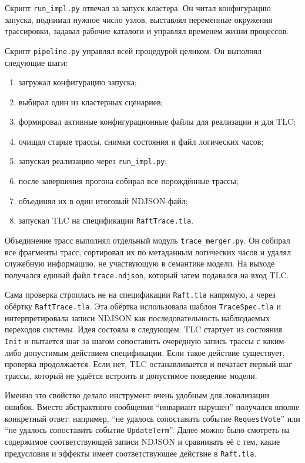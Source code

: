 Скрипт \texttt{run\_impl.py} отвечал за запуск кластера. Он читал конфигурацию
запуска, поднимал нужное число узлов, выставлял переменные окружения
трассировки, задавал рабочие каталоги и управлял временем жизни процессов.

Скрипт \texttt{pipeline.py} управлял всей процедурой целиком. Он выполнял
следующие шаги:

\begin{enumerate}
    \item загружал конфигурацию запуска;
    \item выбирал один из кластерных сценариев;
    \item формировал активные конфигурационные файлы для реализации и для TLC;
    \item очищал старые трассы, снимки состояния и файл логических часов;
    \item запускал реализацию через \texttt{run\_impl.py};
    \item после завершения прогона собирал все порождённые трассы;
    \item объединял их в один итоговый NDJSON-файл;
    \item запускал TLC на спецификации \texttt{RaftTrace.tla}.
\end{enumerate}

Объединение трасс выполнял отдельный модуль \texttt{trace\_merger.py}. Он
собирал все фрагменты трасс, сортировал их по метаданным логических часов и
удалял служебную информацию, не участвующую в семантике модели. На выходе
получался единый файл \texttt{trace.ndjson}, который затем подавался на вход
TLC.

Сама проверка строилась не на спецификации \texttt{Raft.tla} напрямую, а через
обёртку \texttt{RaftTrace.tla}. Эта обёртка использовала шаблон
\texttt{TraceSpec.tla} и интерпретировала записи NDJSON как последовательность
наблюдаемых переходов системы. Идея состояла в следующем: TLC стартует из
состояния \texttt{Init} и пытается шаг за шагом сопоставить очередную запись
трассы с каким-либо допустимым действием спецификации. Если такое действие
существует, проверка продолжается. Если нет, TLC останавливается и печатает
первый шаг трассы, который не удаётся встроить в допустимое поведение модели.

Именно это свойство делало инструмент очень удобным для локализации ошибок.
Вместо абстрактного сообщения ``инвариант нарушен'' получался вполне конкретный
ответ: например, ``не удалось сопоставить событие \texttt{RequestVote}'' или
``не удалось сопоставить событие \texttt{UpdateTerm}''. Далее можно было
смотреть на содержимое соответствующей записи NDJSON и сравнивать её с тем,
какие предусловия и эффекты имеет соответствующее действие в
\texttt{Raft.tla}.

